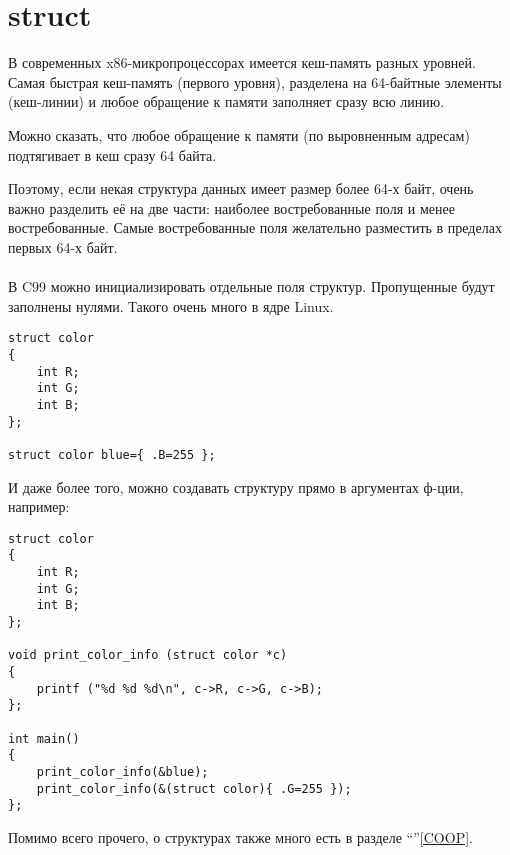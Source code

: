 ﻿\section{struct}

В современных x86-микропроцессорах имеется кеш-память разных уровней. 
Самая быстрая кеш-память (первого уровня),
разделена на 64-байтные элементы (кеш-линии) и любое обращение к памяти заполняет сразу всю линию.

Можно сказать, что любое обращение к памяти (по выровненным адресам) подтягивает в кеш сразу 64 байта.

Поэтому, если некая структура данных имеет размер более 64-х байт, очень важно разделить её на две части:
наиболее востребованные поля и менее востребованные. 
Самые востребованные поля желательно разместить в пределах первых 64-х байт. \\
\\
В C99 можно инициализировать отдельные поля структур. Пропущенные будут заполнены нулями. Такого очень
много в ядре Linux. 

\begin{lstlisting}
struct color
{
	int R;
	int G;
	int B;
};

struct color blue={ .B=255 };
\end{lstlisting}


И даже более того, можно создавать структуру прямо в аргументах ф-ции, например:

\begin{lstlisting}
struct color
{
	int R;
	int G;
	int B;
};

void print_color_info (struct color *c)
{
	printf ("%d %d %d\n", c->R, c->G, c->B);
};

int main()
{
	print_color_info(&blue);
	print_color_info(&(struct color){ .G=255 });
};
\end{lstlisting}

Помимо всего прочего, о структурах также много есть в разделе ``\COOPname''\ref{COOP}.

